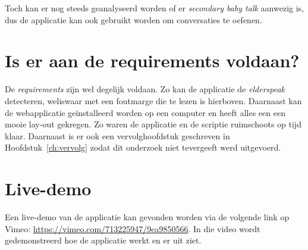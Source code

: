 Toch kan er nog steeds geanalyseerd worden of er \textit{secondary baby talk} aanwezig is, dus de applicatie kan ook gebruikt worden om conversaties te oefenen.

\section{Is er aan de requirements voldaan?}
De \textit{requirements} zijn wel degelijk voldaan. Zo kan de applicatie de \textit{elderspeak} detecteren, weliswaar met een foutmarge die te lezen is hierboven.
Daarnaast kan de webapplicatie geïnstalleerd worden op een computer en heeft alles een een mooie lay-out gekregen.
Zo waren de applicatie en de scriptie ruimschoots op tijd klaar. Daarnaast is er ook een vervolghoofdstuk geschreven in Hoofdstuk~\ref{ch:vervolg} zodat dit onderzoek niet tevergeeft werd uitgevoerd.

\section{Live-demo}
Een live-demo van de applicatie kan gevonden worden via de volgende link op Vimeo: \url{https://vimeo.com/713225947/9ea9850566}.
In die video wordt gedemonstreerd hoe de applicatie werkt en er uit ziet.
